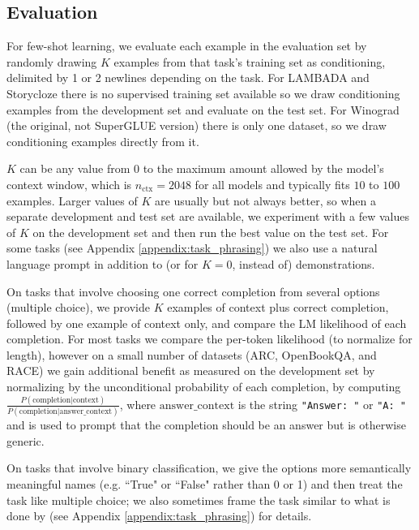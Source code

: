     \subsection{Evaluation}
    \label{section:Evaluation}

For few-shot learning, we evaluate each example in the evaluation set by randomly drawing $K$ examples from that task’s training set as conditioning, delimited by 1 or 2 newlines depending on the task.  For LAMBADA and Storycloze there is no supervised training set available so we draw conditioning examples from the development set and evaluate on the test set.  For Winograd (the original, not SuperGLUE version) there is only one dataset, so we draw conditioning examples directly from it.

$K$ can be any value from 0 to the maximum amount allowed by the model’s context window, which is $n_{\mathrm{ctx}}=2048$ for all models and typically fits $10$ to $100$ examples.  Larger values of $K$ are usually but not always better, so when a separate development and test set are available, we experiment with a few values of $K$ on the development set and then run the best value on the test set.  For some tasks (see Appendix \ref{appendix:task_phrasing}) we also use a natural language prompt in addition to (or for $K=0$, instead of) demonstrations.

On tasks that involve choosing one correct completion from several options (multiple choice), we provide $K$ examples of context plus correct completion, followed by one example of context only, and compare the LM likelihood of each completion.  For most tasks we compare the per-token likelihood (to normalize for length), however on a small number of datasets (ARC, OpenBookQA, and RACE) we gain additional benefit as measured on the development set by normalizing by the unconditional probability of each completion, by computing $\frac{P(\mathrm{completion} | \mathrm{context})}{P(\mathrm{completion} | \mathrm{answer\_context})}$, where $\mathrm{answer\_context}$ is the string \texttt{"Answer: "} or \texttt{"A: "} and is used to prompt that the completion should be an answer but is otherwise generic.

On tasks that involve binary classification, we give the options more semantically meaningful names (e.g. ``True" or ``False" rather than 0 or 1) and then treat the task like multiple choice; we also sometimes frame the task similar to what is done by \cite{raffel2019t5} (see Appendix \ref{appendix:task_phrasing}) for details.

